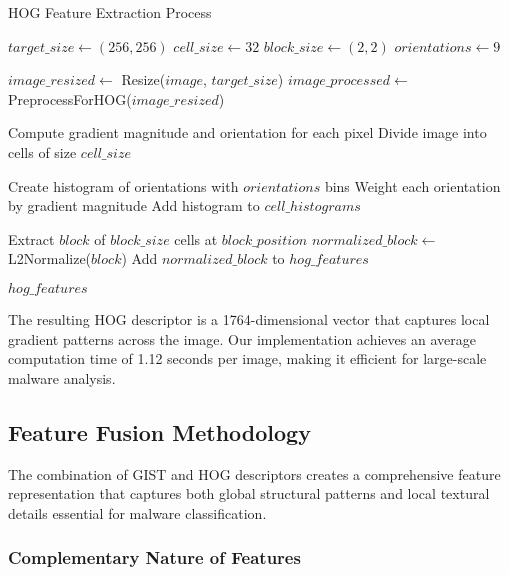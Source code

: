 \begin{algorithm}[!htbp]
\caption{HOG Feature Extraction Process}
\label{alg:hog-implementation}
\begin{algorithmic}[1]
    \State $target\_size \leftarrow (256, 256)$ 
    \State $cell\_size \leftarrow 32$ 
    \State $block\_size \leftarrow (2, 2)$ 
    \State $orientations \leftarrow 9$ 
    
    \State $image\_resized \leftarrow$ Resize($image$, $target\_size$)
    \State $image\_processed \leftarrow$ PreprocessForHOG($image\_resized$)
    
    \State Compute gradient magnitude and orientation for each pixel
    \State Divide image into cells of size $cell\_size$
    
        \State Create histogram of orientations with $orientations$ bins
        \State Weight each orientation by gradient magnitude
        \State Add histogram to $cell\_histograms$
    \EndFor
    
        \State Extract $block$ of $block\_size$ cells at $block\_position$
        \State $normalized\_block \leftarrow$ L2Normalize($block$)
        \State Add $normalized\_block$ to $hog\_features$
    \EndFor
    
    \Return $hog\_features$ 
\EndProcedure
\end{algorithmic}
\end{algorithm}

The resulting HOG descriptor is a 1764-dimensional vector that captures local gradient patterns across the image. Our implementation achieves an average computation time of 1.12 seconds per image, making it efficient for large-scale malware analysis.

\subsection{Feature Fusion Methodology}
\label{subsec:feature-fusion}

The combination of GIST and HOG descriptors creates a comprehensive feature representation that captures both global structural patterns and local textural details essential for malware classification.

\subsubsection{Complementary Nature of Features}

